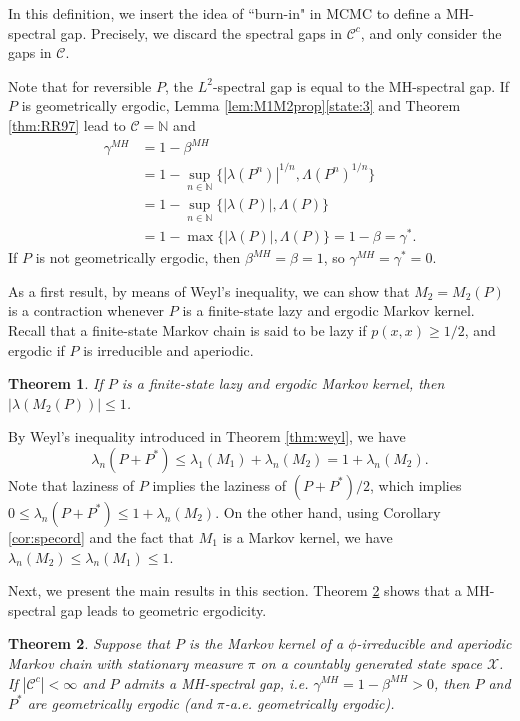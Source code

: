 \documentclass[12pt,a4]{amsart}
\numberwithin{equation}{section}
\theoremstyle{plain}
\newtheorem{theorem}{Theorem}[section]
\theoremstyle{definition}
\theoremstyle{remark}
\let\oldendproof\endproof
\renewenvironment{proof}[1][\proofname]{%
  \oldproof[\noindent\textbf{#1.} ]%
}{\oldendproof}
\newcommand{\1}{\mathds{1}}
\renewcommand{\leq}{\leqslant}
\renewcommand{\geq}{\geqslant}
\begin{document}
In this definition, we insert the idea of ``burn-in" in MCMC to define a MH-spectral gap. Precisely, we discard the spectral gaps in $\mathcal{C}^c$, and only consider the gaps in $\mathcal{C}$.

Note that for reversible $P$, the $L^2$-spectral gap is equal to the MH-spectral gap. If $P$ is geometrically ergodic, Lemma \ref{lem:M1M2prop}\ref{state:3} and Theorem \ref{thm:RR97} lead to $\mathcal{C} = \mathbb{N}$ and
\begin{align*}
	\gamma^{MH} &= 1 - \beta^{MH} \\
				&= 1 - \sup_{n \in \mathbb{N}}\{ |\lambda(P^n)|^{1/n}, \Lambda(P^n)^{1/n} \} \\
			    &= 1 - \sup_{n \in \mathbb{N}}\{ |\lambda(P)|, \Lambda(P) \} \\
			    &= 1 - \max \{ |\lambda(P)|, \Lambda(P) \} = 1 - \beta = \gamma^*.
\end{align*}
If $P$ is not geometrically ergodic, then $\beta^{MH} = \beta = 1$, so $\gamma^{MH} = \gamma^* = 0$.

As a first result, by means of Weyl's inequality, we can show that $M_2 = M_2(P)$ is a contraction whenever $P$ is a finite-state lazy and ergodic Markov kernel. Recall that a finite-state Markov chain is said to be lazy if $p(x,x) \geq 1/2$, and ergodic if $P$ is irreducible and aperiodic.

\begin{theorem}
	If $P$ is a finite-state lazy and ergodic Markov kernel, then $|\lambda(M_2(P))| \leq 1$.
\end{theorem}

\begin{proof}
	By Weyl's inequality introduced in Theorem \ref{thm:weyl}, we have 
	$$\lambda_n(P+P^*) \leq \lambda_1(M_1) + \lambda_n(M_2) = 1 + \lambda_n(M_2).$$
	Note that laziness of $P$ implies the laziness of $(P+P^*)/2$, which implies $0 \leq \lambda_n(P+P^*) \leq 1 + \lambda_n(M_2)$. On the other hand, using Corollary \ref{cor:specord} and the fact that $M_1$ is a Markov kernel, we have $\lambda_n(M_2) \leq \lambda_n(M_1) \leq 1$.
\end{proof}

Next, we present the main results in this section. Theorem \ref{thm:mainresultgeomergod} shows that a MH-spectral gap leads to geometric ergodicity.

\begin{theorem}\label{thm:mainresultgeomergod}
	Suppose that $P$ is the Markov kernel of a $\phi$-irreducible and aperiodic Markov chain with stationary measure $\pi$ on a countably generated state space $\mathcal{X}$. If $|\mathcal{C}^c| < \infty$ and $P$ admits a MH-spectral gap, i.e. $\gamma^{MH} = 1 - \beta^{MH} > 0$, then $P$ and $P^*$ are geometrically ergodic (and $\pi$-a.e. geometrically ergodic).
\end{theorem}
\end{document}
